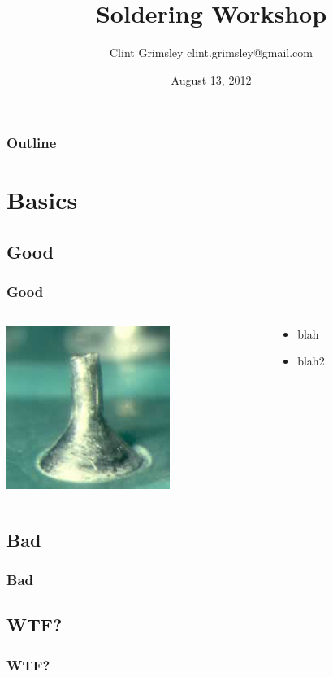 \documentclass{beamer}
\title{Soldering Workshop}
\author{Clint Grimsley clint.grimsley@gmail.com}
\institute{HackRVA}
\date{August 13, 2012}
\begin{document}
\begin{frame}
\titlepage
\end{frame}

\begin{frame}
  \frametitle{Outline}
    \tableofcontents
\end{frame}

\section{Basics}
\subsection{Good}
\begin{frame}
  \frametitle{Good}
  \begin{columns}
    \begin{column}{5cm}
      \includegraphics{images/good_joint.jpg}
    \end{column}
    \vspace{3cm}
    \begin{column}{5cm}
      \begin{itemize}
        \item blah
        \item blah2
      \end{itemize}
    \end{column}
  \end{columns}
\end{frame}
\subsection{Bad}
\begin{frame}
  \frametitle{Bad}
  
\end{frame}
\subsection{WTF?}
\begin{frame}
  \frametitle{WTF?}
  
\end{frame}
\end{document}
